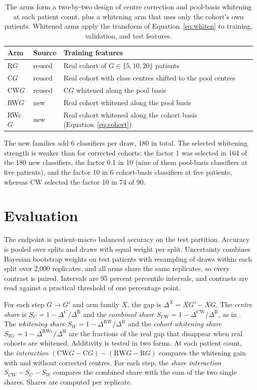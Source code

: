 \documentclass[11pt]{article}
\begin{document}
\begin{table}[htbp]
\centering
\renewcommand{\arraystretch}{1.15}
\begin{tabularx}{\textwidth}{@{}llY@{}}
\toprule
Arm & Source & Training features \\
\midrule
R$G$ & reused & Real cohort of $G\in\{5,10,20\}$ patients \\
C$G$ & reused & Real cohort with class centres shifted to the pool centres \\
CW$G$ & reused & C$G$ whitened along the pool basis \\
RW$G$ & new & Real cohort whitened along the pool basis \\
RWc$G$ & new & Real cohort whitened along the cohort basis (Equation~\ref{eq:cohort}) \\
\bottomrule
\end{tabularx}
\caption{The arms form a two-by-two design of centre correction and pool-basis whitening at each patient count, plus a whitening arm that uses only the cohort's own patients. Whitened arms apply the transform of Equation~\ref{eq:whiten} to training, validation, and test features.}
\label{tab:arms}
\end{table}

\noindent The new families add 6 classifiers per draw, 180 in total. The selected whitening strength is weaker than for corrected cohorts: the factor 1 was selected in 164 of the 180 new classifiers, the factor 0.1 in 10 (nine of them pool-basis classifiers at five patients), and the factor 10 in 6 cohort-basis classifiers at five patients, whereas CW selected the factor 10 in 74 of 90.

\section{Evaluation}
\label{sec:evaluation}
The endpoint is patient-macro balanced accuracy on the test partition. Accuracy is pooled over splits and draws with equal weight per split. Uncertainty combines Bayesian bootstrap weights on test patients \citep{rubin1981bayesian} with resampling of draws within each split over 2,000 replicates, and all arms share the same replicates, so every contrast is paired. Intervals are 95 percent percentile intervals, and contrasts are read against a practical threshold of one percentage point.

For each step $G\to G'$ and arm family $X$, the gap is $\Delta^X=XG'-XG$. The \emph{centre share} is $S_C=1-\Delta^{\mathrm C}/\Delta^{\mathrm R}$ and the \emph{combined share} $S_{CW}=1-\Delta^{\mathrm{CW}}/\Delta^{\mathrm R}$, as in \citet{queisler2026centreError}. The \emph{whitening share} $S_W=1-\Delta^{\mathrm{RW}}/\Delta^{\mathrm R}$ and the \emph{cohort whitening share} $S_{Wc}=1-\Delta^{\mathrm{RWc}}/\Delta^{\mathrm R}$ are the fractions of the real gap that disappear when real cohorts are whitened. Additivity is tested in two forms. At each patient count, the \emph{interaction} $(\mathrm{CW}G-\mathrm CG)-(\mathrm{RW}G-\mathrm RG)$ compares the whitening gain with and without corrected centres. For each step, the \emph{share interaction} $S_{CW}-S_C-S_W$ compares the combined share with the sum of the two single shares. Shares are computed per replicate.
\end{document}
